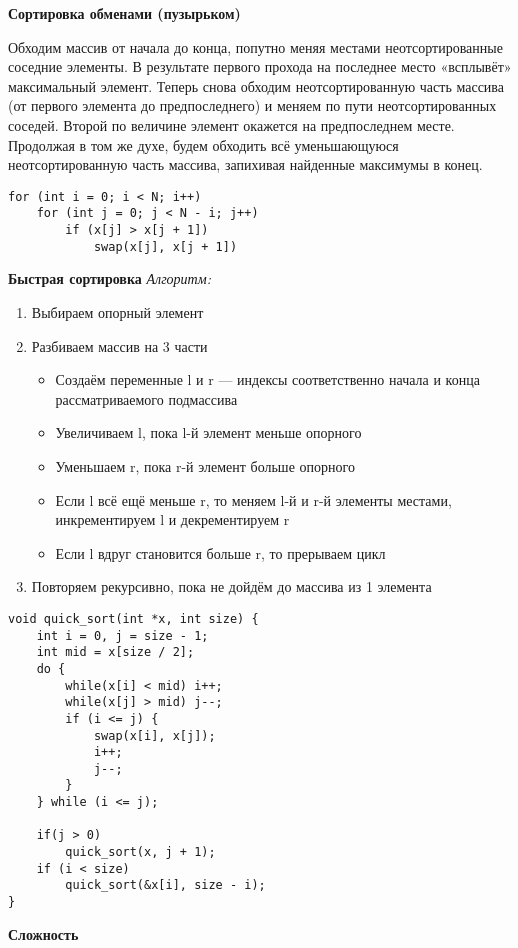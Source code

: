 \textbf{Сортировка обменами (пузырьком)}

Обходим массив от начала до конца, попутно меняя местами неотсортированные соседние элементы. В результате первого прохода на последнее место «всплывёт» максимальный элемент. Теперь снова обходим неотсортированную часть массива (от первого элемента до предпоследнего) и меняем по пути неотсортированных соседей. Второй по величине элемент окажется на предпоследнем месте. Продолжая в том же духе, будем обходить всё уменьшающуюся неотсортированную часть массива, запихивая найденные максимумы в конец.
\begin{verbatim}
for (int i = 0; i < N; i++)
    for (int j = 0; j < N - i; j++)
        if (x[j] > x[j + 1])
            swap(x[j], x[j + 1])
\end{verbatim}
\textbf{Быстрая сортировка}
\textit{Алгоритм:}
\begin{enumerate}
    \item Выбираем опорный элемент
    \item Разбиваем массив на 3 части
    \begin{itemize}
        \item Создаём переменные l и r — индексы соответственно начала и конца рассматриваемого подмассива
        \item Увеличиваем l, пока l-й элемент меньше опорного
        \item Уменьшаем r, пока r-й элемент больше опорного
        \item Если l всё ещё меньше r, то меняем l-й и r-й элементы местами, инкрементируем l и декрементируем r
        \item Если l вдруг становится больше r, то прерываем цикл
    \end{itemize}
    \item Повторяем рекурсивно, пока не дойдём до массива из 1 элемента
\end{enumerate}


\begin{verbatim}
void quick_sort(int *x, int size) {
    int i = 0, j = size - 1;
    int mid = x[size / 2];
    do {
        while(x[i] < mid) i++;
        while(x[j] > mid) j--;
        if (i <= j) {
            swap(x[i], x[j]);
            i++;
            j--;
        }
    } while (i <= j);
    
    if(j > 0)
        quick_sort(x, j + 1);
    if (i < size)
        quick_sort(&x[i], size - i);
}
\end{verbatim}
\textbf{Сложность}

